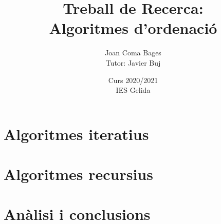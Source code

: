 \documentclass[a4paper,12pt]{report}
\title{Treball de Recerca: \\ Algoritmes d'ordenació}
\author{Joan Coma Bages \\ Tutor: Javier Buj}
\date{Curs 2020/2021 \\ IES Gelida}
\begin{document}
	\maketitle
	\tableofcontents
	
	
	
	
	
	\part{Algoritmes iteratius}
	
	
	
	

	\part{Algoritmes recursius}
	
	
	
	
	\part{Anàlisi i conclusions}
	
	

	

	
	
\end{document}
